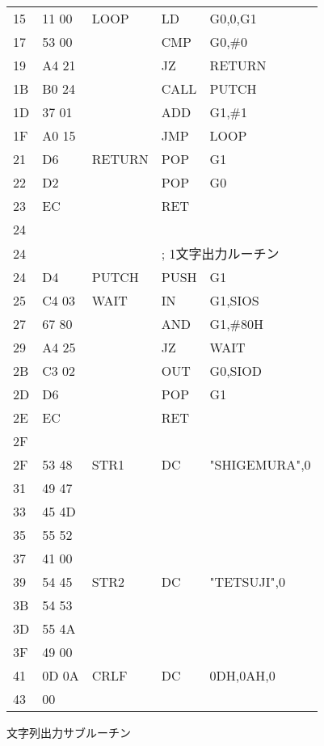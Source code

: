 \begin{figure}[btp]
{\begin{center}
\begin{tabular}{|l|l|l|l l|}
15 & 11 00 &  LOOP   & LD     & G0,0,G1         \\
17 & 53 00 &         & CMP    & G0,\#0          \\
19 & A4 21 &         & JZ     & RETURN          \\
1B & B0 24 &         & CALL   & PUTCH           \\
1D & 37 01 &         & ADD    & G1,\#1          \\
1F & A0 15 &         & JMP    & LOOP            \\
21 & D6    &  RETURN & POP    & G1              \\
22 & D2    &         & POP    & G0              \\
23 & EC    &         & RET    &                 \\
24 &       &         &        &                 \\
24 &       &         & \multicolumn{2}{|l|}{; 1文字出力ルーチン} \\
24 & D4    &  PUTCH  & PUSH   & G1              \\
25 & C4 03 &  WAIT   & IN     & G1,SIOS         \\
27 & 67 80 &         & AND    & G1,\#80H        \\
29 & A4 25 &         & JZ     & WAIT            \\
2B & C3 02 &         & OUT    & G0,SIOD         \\
2D & D6    &         & POP    & G1              \\
2E & EC    &         & RET    &                 \\
2F &       &         &        &                 \\
2F & 53 48 &  STR1   & DC     & "SHIGEMURA",0   \\
31 & 49 47 &         &        &                 \\
33 & 45 4D &         &        &                 \\
35 & 55 52 &         &        &                 \\
37 & 41 00 &         &        &                 \\
39 & 54 45 &  STR2   & DC     & "TETSUJI",0     \\
3B & 54 53 &         &        &                 \\
3D & 55 4A &         &        &                 \\
3F & 49 00 &         &        &                 \\
41 & 0D 0A &  CRLF   & DC     & 0DH,0AH,0       \\
43 & 00    &         &        &                 \\
\hline
\end{tabular}
\end{center}}
\caption{文字列出力サブルーチン}
\label{fig:chap6:outstr}
\end{figure}

